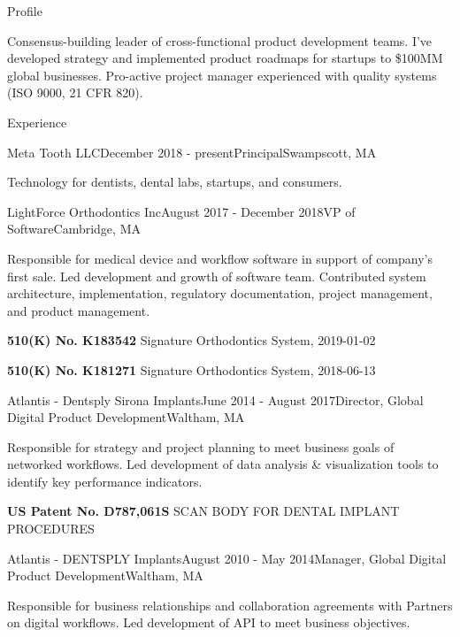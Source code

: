 \documentclass{resume}
\begin{document}
  
\begin{rSection}{Profile}
\item Consensus-building leader of cross-functional product development teams. I've developed strategy and implemented product roadmaps for startups to \$100MM global businesses. Pro-active project manager experienced with quality systems (ISO 9000, 21 CFR 820).
\end{rSection}

\begin{rSection}{Experience}

\begin{rSubsection}{Meta Tooth LLC}{December 2018 - present}{Principal}{Swampscott, MA}
\item Technology for dentists, dental labs, startups, and consumers.
\end{rSubsection}

\begin{rSubsection}{LightForce Orthodontics Inc}{August 2017 - December 2018}{VP of Software}{Cambridge, MA}
\item Responsible for medical device and workflow software in support of company's first sale.  Led development and growth of software team. Contributed system architecture, implementation, regulatory documentation, project management, and product management.
\item \textbf{510(K) No. K183542} Signature Orthodontics System, 2019-01-02
\item \textbf{510(K) No. K181271} Signature Orthodontics System, 2018-06-13
\end{rSubsection}


\begin{rSubsection}{Atlantis - Dentsply Sirona Implants}{June 2014 - August 2017}{Director, Global Digital Product Development}{Waltham, MA}
\item Responsible for strategy and project planning to meet business goals of networked workflows.  Led development of data analysis \& visualization tools to identify key performance indicators.
\item \textbf{US Patent No. D787,061S} SCAN BODY FOR DENTAL IMPLANT PROCEDURES
\end{rSubsection}

\begin{rSubsection}{Atlantis - DENTSPLY Implants}{August 2010 - May 2014}{Manager, Global Digital Product Development}{Waltham, MA}
\item Responsible for business relationships and collaboration agreements with Partners on digital workflows.  Led development of API to meet business objectives.
\end{rSubsection}


\end{rSection}
\end{document}
